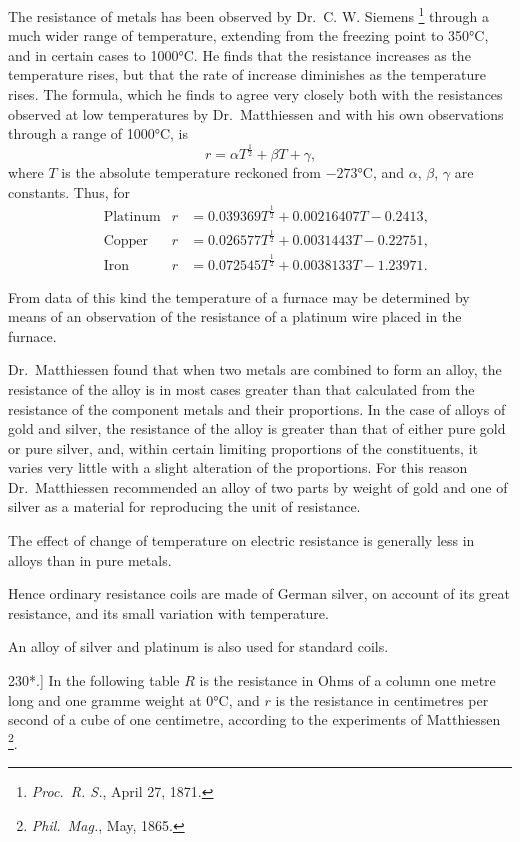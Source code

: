 \documentclass[12pt,oneside]{book}[2021/10/04]
\let\oldfootnote\footnote
\renewcommand\footnote[1]{%
\oldfootnote{\hspace{0.14em}#1}}
\newcommand{\article}[1]{\phantomsection \label{art:#1}{#1.]}}
\newcommand{\¬}{\hphantom{0}}
\begin{document}
The resistance of metals has been observed by Dr.\ C. W. Siemens\footnote{
\textit{Proc.\ R. S.}, April 27, 1871.}
through a much wider range of temperature, extending from the
freezing point to 350°C, and in certain cases to 1000°C. He finds
that the resistance increases as the temperature rises, but that the
rate of increase diminishes as the temperature rises. The formula,
which he finds to agree very closely both with the resistances
observed at low temperatures by Dr.\ Matthiessen and with his
own observations through a range of 1000°C, is
\[
  r = \alpha T^{\frac{1}{2}} + \beta T + \gamma\text{,}
\]
where \(T\) is the absolute temperature reckoned from \(-273\)°C, and
\(\alpha\), \(\beta\), \(\gamma\) are constants. Thus, for
\begin{align*}
&\text{Platinum} & r &= 0.039369T^{\frac{1}{2}} + 0.00216407T - 0.2413\text{,}\\
&\text{Copper} & r &= 0.026577T^{\frac{1}{2}} + 0.0031443T - 0.22751\text{,}\\
&\text{Iron} & r &= 0.072545T^{\frac{1}{2}} + 0.0038133T - 1.23971\text{.}
\end{align*}

From data of this kind the temperature of a furnace may be
determined by means of an observation of the resistance of a
platinum wire placed in the furnace.

Dr.\ Matthiessen found that when two metals are combined to
form an alloy, the resistance of the alloy is in most cases greater
than that calculated from the resistance of the component metals
and their proportions. In the case of alloys of gold and silver, the
resistance of the alloy is greater than that of either pure gold or
pure silver, and, within certain limiting proportions of the constituents,
it varies very little with a slight alteration of the proportions.
For this reason Dr.\ Matthiessen recommended an alloy
of two parts by weight of gold and one of silver as a material
for reproducing the unit of resistance.

The effect of change of temperature on electric resistance is
generally less in alloys than in pure metals.

Hence ordinary resistance coils are made of German silver, on
account of its great resistance, and its small variation with temperature.

An alloy of silver and platinum is also used for standard coils.

\article{230*} In the following table \(R\) is the resistance in Ohms of a
column one metre long and one gramme weight at 0°C, and \(r\) is
the resistance in centimetres per second of a cube of one centimetre,
according to the experiments of Matthiessen\footnote{\textit{Phil.\ Mag.}, May, 1865.}.
\end{document}
